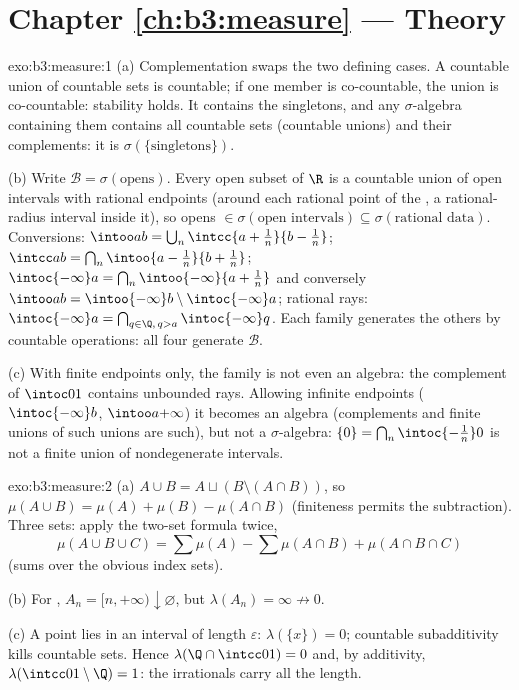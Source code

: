 \section*{Chapter \ref{ch:b3:measure} ---  Theory}

\begin{solution}{exo:b3:measure:1}
(a) Complementation swaps the two defining cases. A countable
union of countable sets is countable; if one member is
co-countable, the union is co-countable: stability holds. It
contains the singletons, and any $\sigma$-algebra containing
them contains all countable sets (countable unions) and their
complements: it is $\sigma(\{\text{singletons}\})$.

(b) Write $\mathcal B = \sigma(\text{opens})$. Every open
subset of $\R$ is a countable union of open intervals with
rational endpoints (around each rational point of the ,
a rational-radius interval inside it), so opens $\in
\sigma(\text{open intervals}) \subseteq \sigma(\text{rational
data})$. Conversions: $\intoo ab = \bigcup_n\intcc{a +
\frac1n}{b - \frac1n}$; $\intcc ab = \bigcap_n \intoo{a -
\frac1n}{b + \frac1n}$; $\intoc{-\infty}a = \bigcap_n
\intoo{-\infty}{a + \frac1n}$ and conversely $\intoo ab =
\intoo{-\infty}b \setminus \intoc{-\infty}a$; rational rays:
$\intoc{-\infty}a =
\bigcap_{q \in \Q,\, q > a}\intoc{-\infty}q$. Each family
generates the others by countable operations: all four generate
$\mathcal B$.

(c) With finite endpoints only, the family is not even an
algebra: the complement of $\intoc01$ contains unbounded rays.
Allowing infinite endpoints ($\intoc{-\infty}b$, $\intoo
a{+\infty}$) it becomes an algebra (complements and finite
unions of such unions are such), but not a $\sigma$-algebra:
$\{0\} = \bigcap_n\intoc{-\frac1n}0$ is not a finite union of
nondegenerate intervals.
\end{solution}

\begin{solution}{exo:b3:measure:2}
(a) $A \cup B = A \sqcup (B \setminus (A\cap B))$, so
$\mu(A\cup B) = \mu(A) + \mu(B) - \mu(A\cap B)$ (finiteness
permits the subtraction). Three sets: apply the two-set formula
twice,
\[
\mu(A\cup B\cup C) = \sum\mu(A) - \sum\mu(A\cap B) +
\mu(A\cap B\cap C)
\]
(sums over the obvious index sets).

(b) For , $A_n = [n, +\infty) \downarrow
\varnothing$, but $\lambda(A_n) = \infty \not\to 0$.

(c) A point lies in an interval of length $\varepsilon$:
$\lambda(\{x\}) = 0$; countable subadditivity kills countable
sets. Hence $\lambda(\Q \cap \intcc01) = 0$ and, by additivity,
$\lambda(\intcc01\setminus\Q) = 1$: the irrationals carry all
the length.
\end{solution}

